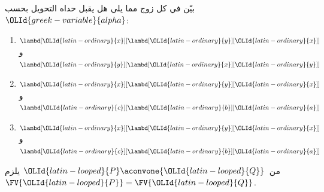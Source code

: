 \documentclass[../../../include/open-logic-section]{subfiles}
\begin{document}
\begin{prob}
  بيّن في كل زوج مما يلي هل يقبل حداه التحويل بحسب~${\OLId{greek-variable}{alpha}}$:
  \begin{enumerate}
  \item $\lambd[{\OLId{latin-ordinary}{x}}][\lambd[{\OLId{latin-ordinary}{y}}][{\OLId{latin-ordinary}{x}}]]$ و$\lambd[{\OLId{latin-ordinary}{y}}][\lambd[{\OLId{latin-ordinary}{x}}][{\OLId{latin-ordinary}{y}}]]$
  \item $\lambd[{\OLId{latin-ordinary}{x}}][\lambd[{\OLId{latin-ordinary}{y}}][{\OLId{latin-ordinary}{x}}]]$ و$\lambd[{\OLId{latin-ordinary}{c}}][\lambd[{\OLId{latin-ordinary}{b}}][{\OLId{latin-ordinary}{a}}]]$
  \item $\lambd[{\OLId{latin-ordinary}{x}}][\lambd[{\OLId{latin-ordinary}{y}}][{\OLId{latin-ordinary}{x}}]]$ و$\lambd[{\OLId{latin-ordinary}{c}}][\lambd[{\OLId{latin-ordinary}{b}}][{\OLId{latin-ordinary}{a}}]]$
  \end{enumerate}
\end{prob}

\begin{lem}
  من~${\OLId{latin-looped}{P}} \aconvone {\OLId{latin-looped}{Q}}$ يلزم~$\FV{{\OLId{latin-looped}{P}}} = \FV{{\OLId{latin-looped}{Q}}}$.
\end{lem}
\end{document}
